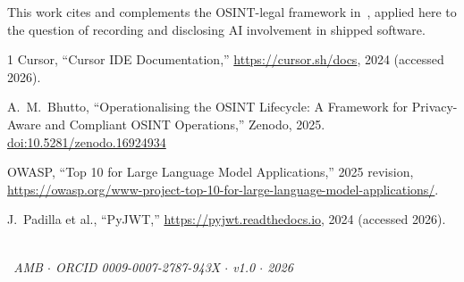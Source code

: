 \documentclass[conference]{IEEEtran}
\begin{document}
This work cites and complements the OSINT-legal framework
in~\cite{bhutto2025osintlegal}, applied here to the question of
recording and disclosing AI involvement in shipped software.

\begin{thebibliography}{1}
Cursor, ``Cursor IDE Documentation,''
\url{https://cursor.sh/docs}, 2024 (accessed 2026).

A.~M.~Bhutto, ``Operationalising the OSINT Lifecycle: A Framework
for Privacy-Aware and Compliant OSINT Operations,'' Zenodo, 2025.
\href{https://doi.org/10.5281/zenodo.16924934}{doi:10.5281/zenodo.16924934}

OWASP, ``Top 10 for Large Language Model Applications,'' 2025
revision, \url{https://owasp.org/www-project-top-10-for-large-language-model-applications/}.

J.~Padilla et al., ``PyJWT,''
\url{https://pyjwt.readthedocs.io}, 2024 (accessed 2026).
\end{thebibliography}

\vspace{0.4em}
\begin{center}
\\[0.2em]
{\footnotesize\itshape ~AMB \(\cdot\) ORCID 0009-0007-2787-943X
\(\cdot\) v1.0 \(\cdot\) 2026~}
\end{center}
\end{document}
